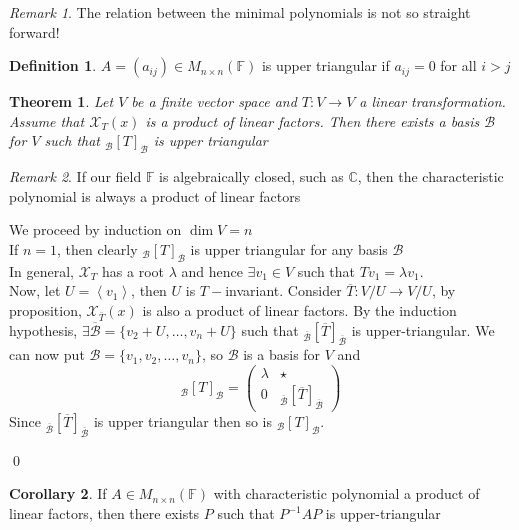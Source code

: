 \documentclass[11pt, a4paper]{report}
\makeatletter
\numberwithin{equation}{section}
\renewcommand{\chi}{\mathcal{X}}
\newcommand{\C}{\mathbb{C}}
\newcommand{\F}{\mathbb{F}}
\newcommand{\spn}[1]{\left\langle #1 \right\rangle}
\newcommand{\pmx}[1]{\begin{pmatrix}#1\end{pmatrix}}
\numberwithin{equation}{subsection}
\theoremstyle{plain}
\newtheorem{thm}{Theorem}[chapter] %
\theoremstyle{definition}
\newtheorem{defn}{Definition}[chapter]
\newtheorem{cor}[thm]{Corollary}
\theoremstyle{remark}
\newtheorem*{rem}{Remark}
\newtheorem*{prf}{Proof}
\renewenvironment{prf}[1][\proofname]{\par
  \vspace{-\topsep}%
  \normalfont
  \topsep0pt \partopsep0pt %
  \trivlist
  \item[\hskip\labelsep
        \itshape
    #1\@addpunct{.}]\ignorespaces
}{%
  \popQED\endtrivlist\@endpefalse
  \addvspace{6pt plus 6pt} %
}
\newcommand{\pr}[1]{\begin{adjustwidth}{1cm}{} \begin{prf} #1 \end{prf} \end{adjustwidth}}
\makeatother
\begin{document}
\begin{rem} The relation between the minimal polynomials is not so straight forward! \end{rem}

\begin{defn} $A = (a_{ij}) \in M_{n \times n}(\F)$ is upper triangular if $a_{ij} = 0$ for all $i > j$ \end{defn}

\begin{thm} Let $V$ be a finite vector space and $T: V \to V$ a linear transformation. Assume that $\chi_T(x)$ is a product of linear factors. Then there exists a basis $\mathcal{B}$ for $V$ such that $_\mathcal{B}[T]_\mathcal{B}$ is upper triangular
\end{thm}

\begin{rem} If our field $\F$ is algebraically closed, such as $\C$, then the characteristic polynomial is always a product of linear factors \end{rem}

\pr{
We proceed by induction on $\dim V = n$\\
If $n = 1$, then clearly $_\mathcal{B}[T]_\mathcal{B}$ is upper triangular for any basis $\mathcal{B}$\\
In general, $\chi_T$ has a root $\lambda$ and hence $\exists v_1 \in V$ such that $Tv_1 = \lambda v_1$.\\
Now, let $U = \spn{v_1}$, then $U$ is $T-$invariant. Consider $\overline{T} : V/U \to V/U$, by proposition, $\chi_{\overline{T}}(x)$ is also a product of linear factors. By the induction hypothesis, $\exists \overline{\mathcal{B}} = \{ v_2 + U, \ldots, v_n + U \}$ such that $_{\overline{\mathcal{B}}}[\overline{T}]_{\overline{\mathcal{B}}}$ is upper-triangular. We can now put $\mathcal{B} = \{ v_1, v_2, \ldots, v_n \}$, so $\mathcal{B}$ is a basis for $V$ and 
$$_\mathcal{B}[T]_\mathcal{B} = \pmx{ \lambda & \star \\ 0 & _{\overline{\mathcal{B}}}[\overline{T}]_{\overline{\mathcal{B}}}}$$
Since $_{\overline{\mathcal{B}}}[\overline{T}]_{\overline{\mathcal{B}}}$ is upper triangular then so is $_\mathcal{B}[T]_\mathcal{B}$.
}\qed

\begin{cor} If $A \in M_{n \times n}(\F)$ with characteristic polynomial a product of linear factors, then there exists $P$ such that $P^{-1}AP$ is upper-triangular \end{cor}

\newpage
\end{document}
